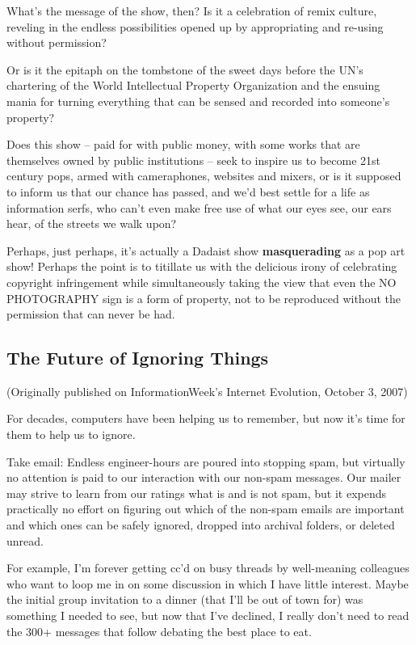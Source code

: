 What's the message of the show, then? Is it a celebration of remix
culture, reveling in the endless possibilities opened up by
appropriating and re-using without permission?

Or is it the epitaph on the tombstone of the sweet days before the
UN's chartering of the World Intellectual Property Organization and
the ensuing mania for turning everything that can be sensed and
recorded into someone's property?

Does this show -- paid for with public money, with some works that
are themselves owned by public institutions -- seek to inspire us
to become 21st century pops, armed with cameraphones, websites and
mixers, or is it supposed to inform us that our chance has passed,
and we'd best settle for a life as information serfs, who can't
even make free use of what our eyes see, our ears hear, of the
streets we walk upon?

Perhaps, just perhaps, it's actually a Dadaist show
\textbf{masquerading} as a pop art show! Perhaps the point is to
titillate us with the delicious irony of celebrating copyright
infringement while simultaneously taking the view that even the NO
PHOTOGRAPHY sign is a form of property, not to be reproduced
without the permission that can never be had.

\subsection{The Future of Ignoring Things}

(Originally published on InformationWeek's Internet Evolution,
October 3, 2007)

For decades, computers have been helping us to remember, but now
it's time for them to help us to ignore.

Take email: Endless engineer-hours are poured into stopping spam,
but virtually no attention is paid to our interaction with our
non-spam messages. Our mailer may strive to learn from our ratings
what is and is not spam, but it expends practically no effort on
figuring out which of the non-spam emails are important and which
ones can be safely ignored, dropped into archival folders, or
deleted unread.

For example, I'm forever getting cc'd on busy threads by
well-meaning colleagues who want to loop me in on some discussion
in which I have little interest. Maybe the initial group invitation
to a dinner (that I'll be out of town for) was something I needed
to see, but now that I've declined, I really don't need to read the
300+ messages that follow debating the best place to eat.

